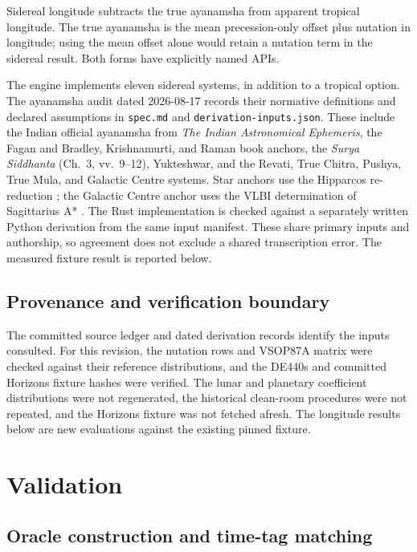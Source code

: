 \documentclass[11pt]{article}
\begin{document}
Sidereal longitude subtracts the true ayanamsha from apparent tropical longitude.
The true ayanamsha is the mean precession-only offset plus nutation in longitude;
using the mean offset alone would retain a nutation term in the sidereal result.
Both forms have explicitly named APIs.

The engine implements eleven sidereal systems, in addition to a tropical option.
The ayanamsha audit dated 2026-08-17 records their normative definitions and
declared assumptions in \texttt{spec.md} and \texttt{derivation-inputs.json}.
These include the Indian official ayanamsha from
\emph{The Indian Astronomical Ephemeris}, the Fagan and Bradley, Krishnamurti, and Raman
book anchors, the \emph{Surya Siddhanta} (Ch.~3, vv.~9--12), Yukteshwar,
and the Revati, True Chitra, Pushya, True Mula, and Galactic Centre systems.
Star anchors use the Hipparcos re-reduction \citep{vanleeuwen2007hipparcos};
the Galactic Centre anchor uses the VLBI determination of Sagittarius A*
\citep{gordon2023sgra}.
The Rust implementation is checked against a separately written Python derivation from
the same input manifest. These share primary inputs and authorship, so agreement does
not exclude a shared transcription error. The measured fixture result is reported below.

\subsection{Provenance and verification boundary}

The committed source ledger and dated derivation records identify the inputs consulted.
For this revision, the nutation rows and VSOP87A matrix were checked against their
reference distributions, and the DE440s and committed Horizons fixture hashes were
verified. The lunar and planetary coefficient distributions were not regenerated,
the historical clean-room procedures were not repeated, and the Horizons fixture was
not fetched afresh. The longitude results below are new evaluations against the
existing pinned fixture.

\section{Validation}

\subsection{Oracle construction and time-tag matching}
\end{document}
